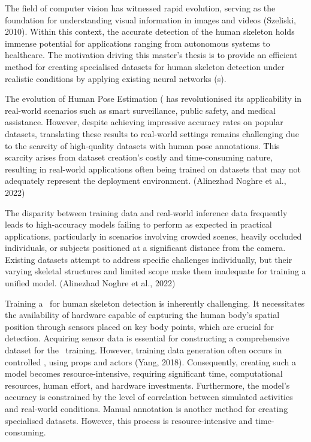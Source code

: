 
The field of computer vision has witnessed rapid evolution, serving as the foundation for understanding visual information in images and videos (\scc Szeliski, 2010). Within this context, the accurate detection of the human skeleton holds immense potential for applications ranging from autonomous systems to healthcare. The motivation driving this master's thesis is to provide an efficient method for creating specialised datasets for human skeleton detection under realistic conditions by applying existing neural networks (\NN\-s).

The evolution of Human Pose Estimation (\HPE\) has revolutionised its applicability in real-world scenarios such as smart surveillance, public safety, and medical assistance. However, despite achieving impressive accuracy rates on popular datasets, translating these results to real-world settings remains challenging due to the scarcity of high-quality datasets with human pose annotations. This scarcity arises from dataset creation's costly and time-consuming nature, resulting in real-world applications often being trained on datasets that may not adequately represent the deployment environment. (\scc Alinezhad Noghre et al., 2022)

The disparity between training data and real-world inference data frequently leads to high-accuracy models failing to perform as expected in practical applications, particularly in scenarios involving crowded scenes, heavily occluded individuals, or subjects positioned at a significant distance from the camera. Existing datasets attempt to address specific challenges individually, but their varying skeletal structures and limited scope make them inadequate for training a unified model. (\scc Alinezhad Noghre et al., 2022)

Training a \NN\ for human skeleton detection is inherently challenging. It necessitates the availability of hardware capable of capturing the human body's spatial position through sensors placed on key body points, which are crucial for detection. Acquiring sensor data is essential for constructing a comprehensive dataset for the \NN\ training. However, training data generation often occurs in controlled , using props and actors (\scc Yang, 2018). Consequently, creating such a model becomes resource-intensive, requiring significant time, computational resources, human effort, and hardware investments.
Furthermore, the model's accuracy is constrained by the level of correlation between simulated activities and real-world conditions. Manual annotation is another method for creating specialised datasets. However, this process is resource-intensive and time-consuming.

